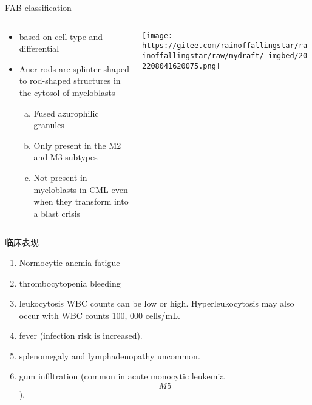 \documentclass[
  ignorenonframetext,
]{beamer}
\begin{document}
\begin{frame}
\begin{block}{FAB classification}
\protect\hypertarget{fab-classification}{}
\begin{columns}[T]
\begin{column}{0.3\textwidth}
\begin{itemize}
\item
  based on cell type and differential
\item
  Auer rods are splinter-shaped to rod-shaped structures in the cytosol
  of myeloblasts

  \begin{enumerate}
  [(a)]
  \item
    Fused azurophilic granules
  \item
    Only present in the M2 and M3 subtypes
  \item
    Not present in myeloblasts in CML even when they transform into a
    blast crisis
  \end{enumerate}
\end{itemize}
\end{column}

\begin{column}{0.7\textwidth}
\texttt{[image: https://gitee.com/rainoffallingstar/rainoffallingstar/raw/mydraft/\_imgbed/202208041620075.png]}
\end{column}
\end{columns}
\end{block}
\end{frame}

\begin{frame}
\begin{block}{临床表现}
\protect\hypertarget{ux4e34ux5e8aux8868ux73b0-5}{}
\begin{enumerate}
\item
  Normocytic anemia fatigue
\item
  thrombocytopenia bleeding
\item
  leukocytosis WBC counts can be low or high. Hyperleukocytosis may also
  occur with WBC counts 100, 000 cells/mL.
\item
  fever (infection risk is increased).
\item
  splenomegaly and lymphadenopathy uncommon.
\item
  gum infiltration (common in acute monocytic leukemia \[M5\]).
\end{enumerate}
\end{block}
\end{frame}
\end{document}
